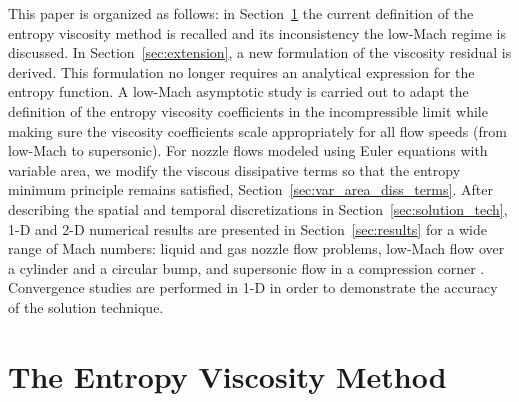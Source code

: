 \documentclass[preprint,10pt]{elsarticle}
\renewcommand{\div}{\vec{\nabla}\! \cdot \!}
\newcommand{\grad}{\vec{\nabla}}
\newcommand{\eqt}[1]{Eq.~(\ref{#1})}                     %
\newcommand{\sct}[1]{Section~\ref{#1}}                   %
\newcommand{\tcr}[1]{\textcolor{red}{#1}}
\begin{document}
This paper is organized as follows: in \sct{sec:entro_visc} the current definition of the entropy viscosity method is recalled and 
its inconsistency the low-Mach regime is discussed. 
In \sct{sec:extension}, a new formulation of the viscosity residual is derived. This formulation no longer requires an analytical expression 
for the entropy function. A low-Mach asymptotic study is carried out to adapt the definition of the entropy viscosity coefficients 
in the incompressible limit while making sure the viscosity coefficients scale appropriately for all flow speeds (from low-Mach to supersonic).
For nozzle flows modeled using Euler equations with variable area, we modify the viscous dissipative terms so that the entropy minimum principle 
remains satisfied, \sct{sec:var_area_diss_terms}.
After describing the spatial and temporal discretizations in \sct{sec:solution_tech}, 1-D and 2-D numerical results 
are presented in \sct{sec:results} for a wide range of Mach numbers: liquid and gas nozzle flow problems, 
low-Mach flow over a cylinder and a circular bump, and supersonic flow in a compression corner \cite{CompressionCorner}. 
Convergence studies are performed in 1-D in order to demonstrate the accuracy of the solution technique. 


\section{The Entropy Viscosity Method} \label{sec:entro_visc}
\end{document}
